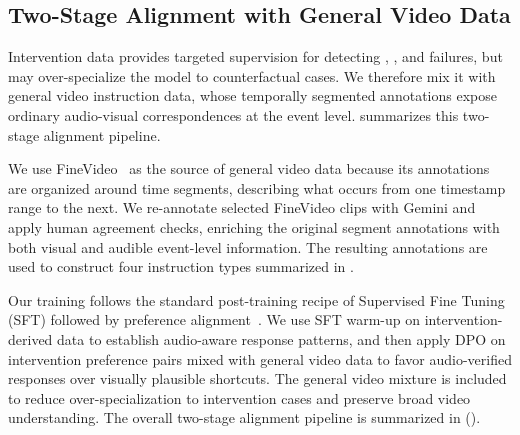 \subsection{Two-Stage Alignment with General Video Data}
\label{sec:MGVID}

Intervention data provides targeted supervision for detecting \shift, \mute, and \swap failures, but may over-specialize the model to counterfactual cases. We therefore mix it with general video instruction data, whose temporally segmented annotations expose ordinary audio-visual correspondences at the event level.  summarizes this two-stage alignment pipeline.


We use FineVideo~\cite{Farre2024FineVideo} as the source of general video data because its annotations are organized around time segments, describing what occurs from one timestamp range to the next. We re-annotate selected FineVideo clips with Gemini and apply human agreement checks, enriching the original segment annotations with both visual and audible event-level information. The resulting annotations are used to construct four instruction types summarized in .



Our training follows the standard post-training recipe of Supervised Fine Tuning (SFT) followed by preference alignment~\cite{DBLP:conf/nips/ChristianoLBMLA17, DBLP:journals/corr/abs-1909-08593, DBLP:conf/nips/Ouyang0JAWMZASR22}. 
We use SFT warm-up on intervention-derived data to establish audio-aware response patterns, and then apply DPO on intervention preference pairs mixed with general video data to favor audio-verified responses over visually plausible shortcuts. The general video mixture is included to reduce over-specialization to intervention cases and preserve broad video understanding. The overall two-stage alignment pipeline is summarized in  ().


